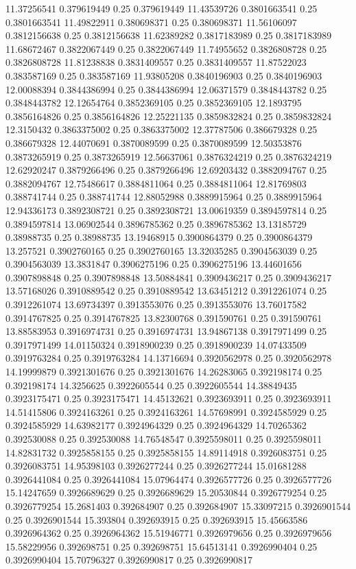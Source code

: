{11.37256541 0.379619449 0.25 0.379619449
11.43539726 0.3801663541 0.25 0.3801663541
11.49822911 0.380698371 0.25 0.380698371
11.56106097 0.3812156638 0.25 0.3812156638
11.62389282 0.3817183989 0.25 0.3817183989
11.68672467 0.3822067449 0.25 0.3822067449
11.74955652 0.3826808728 0.25 0.3826808728
11.81238838 0.3831409557 0.25 0.3831409557
11.87522023 0.383587169 0.25 0.383587169
11.93805208 0.3840196903 0.25 0.3840196903
12.00088394 0.3844386994 0.25 0.3844386994
12.06371579 0.3848443782 0.25 0.3848443782
12.12654764 0.3852369105 0.25 0.3852369105
12.1893795 0.3856164826 0.25 0.3856164826
12.25221135 0.3859832824 0.25 0.3859832824
12.3150432 0.3863375002 0.25 0.3863375002
12.37787506 0.386679328 0.25 0.386679328
12.44070691 0.3870089599 0.25 0.3870089599
12.50353876 0.3873265919 0.25 0.3873265919
12.56637061 0.3876324219 0.25 0.3876324219
12.62920247 0.3879266496 0.25 0.3879266496
12.69203432 0.3882094767 0.25 0.3882094767
12.75486617 0.3884811064 0.25 0.3884811064
12.81769803 0.388741744 0.25 0.388741744
12.88052988 0.3889915964 0.25 0.3889915964
12.94336173 0.3892308721 0.25 0.3892308721
13.00619359 0.3894597814 0.25 0.3894597814
13.06902544 0.3896785362 0.25 0.3896785362
13.13185729 0.38988735 0.25 0.38988735
13.19468915 0.3900864379 0.25 0.3900864379
13.257521 0.3902760165 0.25 0.3902760165
13.32035285 0.3904563039 0.25 0.3904563039
13.3831847 0.3906275196 0.25 0.3906275196
13.44601656 0.3907898848 0.25 0.3907898848
13.50884841 0.3909436217 0.25 0.3909436217
13.57168026 0.3910889542 0.25 0.3910889542
13.63451212 0.3912261074 0.25 0.3912261074
13.69734397 0.3913553076 0.25 0.3913553076
13.76017582 0.3914767825 0.25 0.3914767825
13.82300768 0.391590761 0.25 0.391590761
13.88583953 0.3916974731 0.25 0.3916974731
13.94867138 0.3917971499 0.25 0.3917971499
14.01150324 0.3918900239 0.25 0.3918900239
14.07433509 0.3919763284 0.25 0.3919763284
14.13716694 0.3920562978 0.25 0.3920562978
14.19999879 0.3921301676 0.25 0.3921301676
14.26283065 0.392198174 0.25 0.392198174
14.3256625 0.3922605544 0.25 0.3922605544
14.38849435 0.3923175471 0.25 0.3923175471
14.45132621 0.3923693911 0.25 0.3923693911
14.51415806 0.3924163261 0.25 0.3924163261
14.57698991 0.3924585929 0.25 0.3924585929
14.63982177 0.3924964329 0.25 0.3924964329
14.70265362 0.392530088 0.25 0.392530088
14.76548547 0.3925598011 0.25 0.3925598011
14.82831732 0.3925858155 0.25 0.3925858155
14.89114918 0.3926083751 0.25 0.3926083751
14.95398103 0.3926277244 0.25 0.3926277244
15.01681288 0.3926441084 0.25 0.3926441084
15.07964474 0.3926577726 0.25 0.3926577726
15.14247659 0.3926689629 0.25 0.3926689629
15.20530844 0.3926779254 0.25 0.3926779254
15.2681403 0.392684907 0.25 0.392684907
15.33097215 0.3926901544 0.25 0.3926901544
15.393804 0.392693915 0.25 0.392693915
15.45663586 0.3926964362 0.25 0.3926964362
15.51946771 0.3926979656 0.25 0.3926979656
15.58229956 0.392698751 0.25 0.392698751
15.64513141 0.3926990404 0.25 0.3926990404
15.70796327 0.3926990817 0.25 0.3926990817
}\cubicevent
{}\cubicsweep
